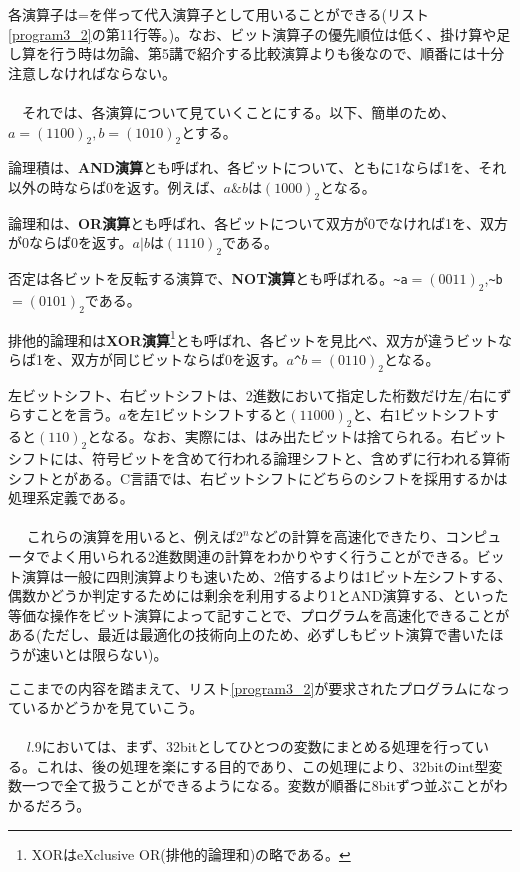各演算子は=を伴って代入演算子として用いることができる(リスト\ref{program3_2}の第11行等。)。なお、ビット演算子の優先順位は低く、掛け算や足し算を行う時は勿論、第5講で紹介する比較演算よりも後なので、順番には十分注意しなければならない。
\\　\\
　それでは、各演算について見ていくことにする。以下、簡単のため、$a=(1100)_2,b=(1010)_2$とする。

論理積は、\textbf{AND演算}とも呼ばれ、各ビットについて、ともに1ならば1を、それ以外の時ならば0を返す。例えば、$a\&b$は$(1000)_2$となる。

論理和は、\textbf{OR演算}とも呼ばれ、各ビットについて双方が0でなければ1を、双方が0ならば0を返す。$a|b$は$(1110)_2$である。

否定は各ビットを反転する演算で、\textbf{NOT演算}とも呼ばれる。\verb|~a|$=(0011)_2$,\verb|~b|$=(0101)_2$である。

排他的論理和は\textbf{XOR演算}\footnote{XORはeXclusive OR(排他的論理和)の略である。}とも呼ばれ、各ビットを見比べ、双方が違うビットならば1を、双方が同じビットならば0を返す。$a$\verb|^|$b=(0110)_2$となる。

左ビットシフト、右ビットシフトは、2進数において指定した桁数だけ左/右にずらすことを言う。$a$を左1ビットシフトすると$(11000)_2$と、右1ビットシフトすると$(110)_2$となる。なお、実際には、はみ出たビットは捨てられる。右ビットシフトには、符号ビットを含めて行われる論理シフトと、含めずに行われる算術シフトとがある。C言語では、右ビットシフトにどちらのシフトを採用するかは処理系定義である。
\\　\\　
これらの演算を用いると、例えば$2^n$などの計算を高速化できたり、コンピュータでよく用いられる2進数関連の計算をわかりやすく行うことができる。ビット演算は一般に四則演算よりも速いため、2倍するよりは1ビット左シフトする、偶数かどうか判定するためには剰余を利用するより1とAND演算する、といった等価な操作をビット演算によって記すことで、プログラムを高速化できることがある(ただし、最近は最適化の技術向上のため、必ずしもビット演算で書いたほうが速いとは限らない)。

ここまでの内容を踏まえて、リスト\ref{program3_2}が要求されたプログラムになっているかどうかを見ていこう。
\\　\\　
$l$.9においては、まず、32bitとしてひとつの変数にまとめる処理を行っている。これは、後の処理を楽にする目的であり、この処理により、32bitのint型変数一つで全て扱うことができるようになる。変数が順番に8bitずつ並ぶことがわかるだろう。

